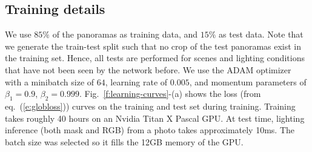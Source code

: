 \subsection{Training details} 
\label{sec:training-details}

We use $85\%$ of the panoramas as training data, and $15\%$ as test data. Note that we generate the train-test split such that no crop of the test panoramas exist in the training set. Hence, all tests are performed for scenes and lighting conditions that have not been seen by the network before. We use the ADAM optimizer~\cite{kingma2014adam} with a minibatch size of $64$, learning rate of $0.005$, and momentum parameters of $\beta_1=0.9$, $\beta_2=0.999$. Fig.~\ref{f:learning-curves}-(a) shows the loss (from eq.~(\ref{e:globloss})) curves on the training and test set during training. Training takes roughly 40 hours on an Nvidia Titan X Pascal GPU. At test time, lighting inference (both mask and RGB) from a photo takes approximately 10ms. The batch size was selected so it fills the 12GB memory of the GPU.


